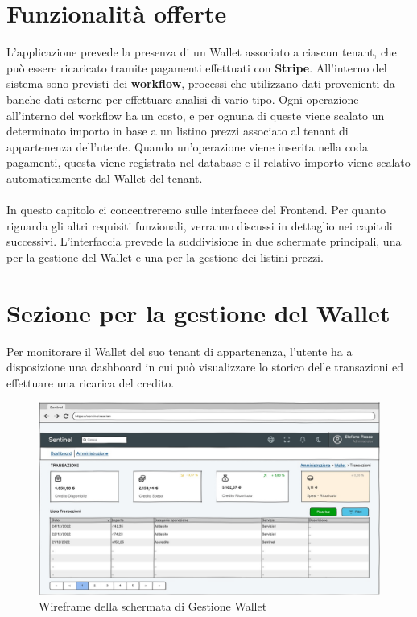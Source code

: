 \section{Funzionalit\`a offerte}
L'applicazione prevede la presenza di un Wallet associato a ciascun tenant, che pu\`o essere ricaricato tramite pagamenti effettuati con \textbf{Stripe}.
All'interno del sistema sono previsti dei \textbf{workflow}, processi che utilizzano dati provenienti da banche dati esterne per effettuare analisi di vario tipo.
Ogni operazione all'interno del workflow ha un costo, e per ognuna di queste viene scalato un determinato importo in base a un listino prezzi associato al tenant di appartenenza dell'utente.
Quando un'operazione viene inserita nella coda pagamenti, questa viene registrata nel database e il relativo importo viene scalato automaticamente dal Wallet del tenant.
\\\\
In questo capitolo ci concentreremo sulle interfacce del Frontend. Per quanto riguarda gli altri requisiti funzionali, verranno discussi in dettaglio nei capitoli successivi.
L'interfaccia prevede la suddivisione in due schermate principali, una per la gestione del Wallet e una per la gestione dei listini prezzi.

\section{Sezione per la gestione del Wallet}
Per monitorare il Wallet del suo tenant di appartenenza, l'utente ha a disposizione una dashboard in cui pu\`o visualizzare lo storico delle transazioni ed effettuare una ricarica del credito.

\begin{figure}[H]
  \centering
  \includegraphics[width=13cm]{images/gestione-wallet/mock-gestione-wallet.png}
  \caption{Wireframe della schermata di Gestione Wallet}
\end{figure}

